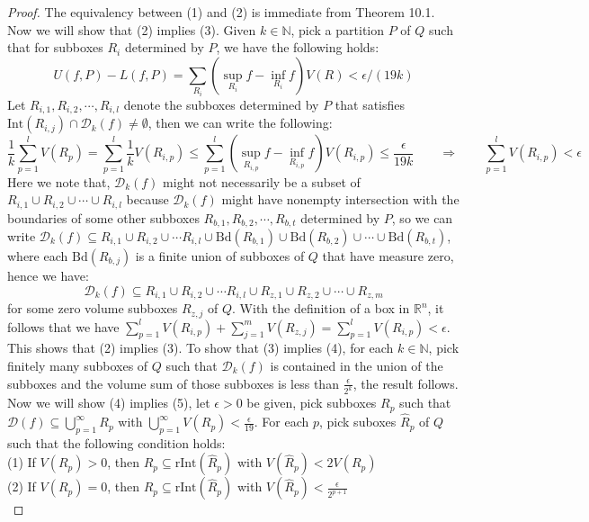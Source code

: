 \documentclass[11pt,oneside]{book}
\theoremstyle{break}
\theoremstyle{break}
\newcommand{\R}{\mathbb{R}}
\newcommand{\N}{\mathbb{N}}
\newcommand{\D}{\mathcal{D}}
\newcommand{\Int}{\text{Int}}
\newcommand{\Bd}{\text{Bd}}
\begin{document}
\begin{proof}
The equivalency between (1) and (2) is immediate from Theorem 10.1. Now we will show that (2) implies (3). Given $k \in \N$, pick a partition $P$ of $Q$ such that for subboxes $R_i$ determined by $P$, we have the following holds: $$U(f,P) - L(f,P)=\sum_{R_i}\left(\sup_{R_i} f- \inf_{R_i} f\right)V(R) < \epsilon/(19k)$$
Let $R_{i,1},R_{i,2},\cdots, R_{i,l}$ denote the subboxes determined by $P$ that satisfies $\Int(R_{i,j}) \cap \D_k(f)\neq \emptyset$, then we can write the following:
$$\frac{1}{k}\sum_{p=1}^l V(R_p) = \sum_{p=1}^l \frac{1}{k} V(R_{i,p}) \leq \sum_{p=1}^l \left(\sup_{R_{i,p}} f - \inf_{R_{i,p}} f\right) V(R_{i,p}) \leq \frac{\epsilon}{19k}\qquad\Rightarrow\qquad \sum_{p=1}^l V(R_{i,p}) < \epsilon$$
Here we note that, $\D_k(f)$ might not necessarily be a subset of $R_{i,1} \cup R_{i,2}\cup\cdots\cup R_{i,l}$ because $\D_k(f)$ might have nonempty intersection with the boundaries of some other subboxes $R_{b,1},R_{b,2},\cdots, R_{b,t}$ determined by $P$, so we can write $\D_k(f)\subseteq R_{i,1}\cup R_{i,2} \cup \cdots R_{i,l} \cup\Bd(R_{b,1}) \cup \Bd(R_{b,2}) \cup \cdots \cup \Bd(R_{b,t})$, where each $\Bd(R_{b,j})$ is a finite union of subboxes of $Q$ that have measure zero, hence we have: $$\D_k(f) \subseteq R_{i,1}\cup R_{i,2} \cup \cdots R_{i,l} \cup  R_{z,1}\cup R_{z,2} \cup \cdots \cup R_{z,m}$$
for some zero volume subboxes $R_{z,j}$ of $Q$. With the definition of a box in $\R^n$, it follows that we have $\sum_{p=1}^l V(R_{i,p}) + \sum_{j=1}^m V(R_{z,j}) = \sum_{p=1}^l V(R_{i,p})< \epsilon$. This shows that (2) implies (3). To show that (3) implies (4), for each $k \in \N$, pick finitely many subboxes of $Q$ such that $\D_k(f)$ is contained in the union of the subboxes and the volume sum of those subboxes is less than $\frac{\epsilon}{2^k}$, the result follows. Now we will show (4) implies (5), let $\epsilon>0$ be given, pick subboxes $R_p$ such that $\D(f) \subseteq \bigcup_{p=1}^\infty R_p$ with $\bigcup_{p=1}^\infty V(R_p) < \frac{\epsilon}{19}$. For each $p$, pick suboxes $\hat{R}_p$ of $Q$ such that the following condition holds: \\
(1) If $V(R_p) >0$, then $R_p \subseteq \text{rInt}(\hat{R}_p)$ with $V(\hat{R}_p) < 2V(R_p)$\\
(2) If $V(R_p) = 0$, then $R_p \subseteq \text{rInt}(\hat{R}_p)$ with $V(\hat{R}_p) < \frac{\epsilon}{2^{p+1}}$ \\

\end{proof}
\end{document}
